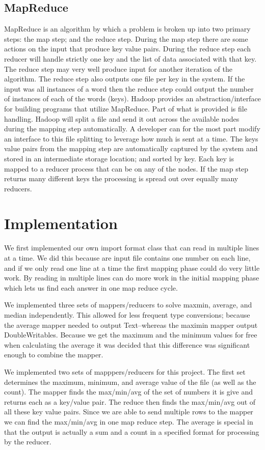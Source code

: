 \documentclass[11pt]{article}
\begin{document}
\subsection*{MapReduce}
MapReduce is an algorithm by which a problem is broken up into two primary steps: the map step; and the reduce step.  During the map step there are some actions on the input that produce key value pairs.  During the reduce step each reducer will handle strictly one key and the list of data associated with that key.  The reduce step may very well produce input for another iteration of the algorithm.  The reduce step also outputs one file per key in the system.  If the input was all instances of a word then the reduce step could output the number of instances of each of the words (keys).  Hadoop provides an abstraction/interface for building programs that utilize MapReduce.  Part of what is provided is file handling.  Hadoop will split a file and send it out across the available nodes during the mapping step automatically.  A developer can for the most part modify an interface to this file splitting to leverage how much is sent at a time.  The keys value pairs from the mapping step are automatically captured by the system and stored in an intermediate storage location; and sorted by key.  Each key is mapped to a reducer process that can be on any of the nodes.  If the map step returns many different keys the processing is spread out over equally many reducers.

\section{Implementation}
We first implemented our own import format class that can read in multiple lines at a time.  We did this because are input file contains one number on each line, and if we only read one line at a time the first mapping phase could do very little work.  By reading in multiple lines can do more work in the initial mapping phase which lets us find each answer in one map reduce cycle.

We implemented three sets of mappers/reducers to solve maxmin, average, and median independently.  This allowed for less frequent type conversions; because the average mapper needed to output Text--whereas the maximin mapper output DoubleWritables.  Because we get the maximum and the minimum values for free when calculating the average it was decided that this difference was significant enough to combine the mapper.

We implemented two sets of mapppers/reducers for this project.  The first set determines the maximum, minimum,  and average value of the file (as well as the count).  The mapper finds the max/min/avg of the set of numbers it is give and returns each as a key/value pair.  The reduce then finds the max/min/avg out of all these key value pairs.  Since we are able to send multiple rows to the mapper we can find the max/min/avg in one map reduce step.  The average is special in that the output is actually a sum and a count in a specified format for processing by the reducer.
\end{document}
